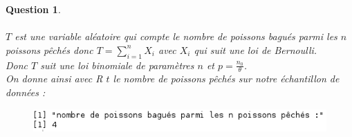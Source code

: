 \documentclass[a4paper,11pt]{article}
\newtheorem{exo1}{Question}
\begin{document}
\begin{exo1} \ \\ \\
$T$ est une variable aléatoire qui compte le nombre de poissons bagués parmi les $n$ poissons pêchés donc $T=\sum_{i=1}^{n}X_{i}$ avec $X_{i}$ qui suit une loi de Bernoulli. \ \\
Donc $T$ suit une loi binomiale de paramètres $n$ et $p=\frac{n_{0}}{\theta}$. \ \\
On donne ainsi avec R $t$ le nombre de poissons pêchés sur notre échantillon de données :
\begin{figure}[h]
\includegraphics[scale=0.7]{images/Q1_2.png}
\end{figure} \ \\
\end{exo1}
\end{document}
